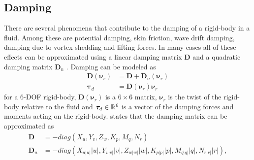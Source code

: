 \subsection{Damping}

There are several phenomena that contribute to the damping of a rigid-body in
a fluid. Among these are potential damping, skin friction, wave drift damping,
damping due to vortex shedding and lifting forces. In many cases
all of these effects can be approximated using a linear damping matrix $\bm{D}$ and
a quadratic damping matrix $\bm{D}_n$ \cite{fossen2021}. Damping can be modeled
as
\begin{align}
    \bm{D}(\bm{\nu}_r) &= \bm{D} + \bm{D}_n(\bm{\nu}_r) \\
    \bm{\tau}_d &= \bm{D}(\bm{\nu}_r)\bm{\nu}_r
\end{align}
for a 6-DOF rigid-body, $\bm{D}(\bm{\nu}_r)$ is a $6\times 6$ matrix, $\bm{\nu}_r$
is the twist of the rigid-body relative to the fluid and $\bm{\tau}_d \in \mathbb{R}^6$
is a vector of the damping forces and moments acting on the rigid-body. \cite{antonelli2018}
states that the damping matrix can be approximated as
\begin{subequations}
\begin{align}
    \bm{D} &= -diag(X_u, Y_v, Z_w, K_p, M_q, N_r) \\
    \bm{D}_n &= -diag(X_{u|u|}|u|, Y_{v|v|}|v|, Z_{w|w|}|w|, K_{p|p|}|p|, M_{q|q|}|q|, N_{r|r|}|r|),
\end{align}
\end{subequations}

